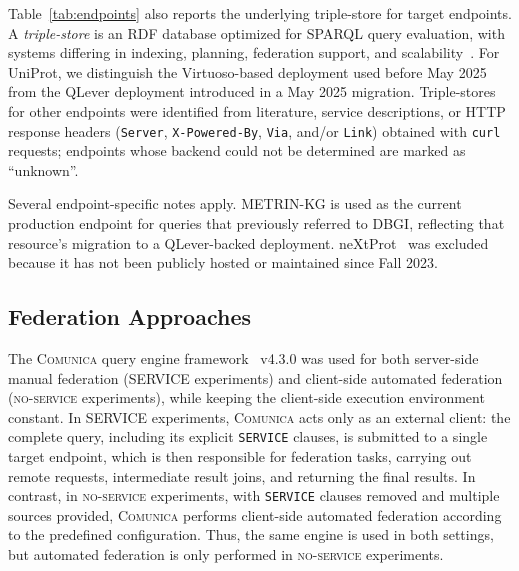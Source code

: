 \documentclass[runningheads]{llncs}
\begin{document}
Table~\ref{tab:endpoints} also reports the underlying triple-store for target endpoints. 
A \textit{triple-store} is an RDF database optimized for SPARQL query evaluation, with systems differing in indexing, planning, federation support, and scalability~\cite{Erling2009VirtuosoRDF,bast2017qlever}. 
For UniProt, we distinguish the Virtuoso-based deployment used before May 2025 from the QLever deployment introduced in a May 2025 migration. 
Triple-stores for other endpoints were identified from literature, service descriptions, or HTTP response headers (\texttt{Server}, \texttt{X-Powered-By}, \texttt{Via}, and/or \texttt{Link}) obtained with \texttt{curl} requests; endpoints whose backend could not be determined are marked as ``unknown''.

Several endpoint-specific notes apply. 
METRIN-KG is used as the current production endpoint for queries that previously referred to DBGI, reflecting that resource's migration to a QLever-backed deployment. 
neXtProt~\cite{ZahnZabal2020neXtProt} was excluded because it has not been publicly hosted or maintained since Fall 2023. 


\subsection{Federation Approaches}\label{sec4.3}
The \textsc{Comunica} query engine framework~\cite{taelman2018comunica} v4.3.0 was used for both server-side manual federation (\textsc{SERVICE} experiments) and client-side automated federation (\textsc{no-service} experiments), while keeping the client-side execution environment constant. 
In \textsc{SERVICE} experiments, \textsc{Comunica} acts only as an external client: the complete query, including its explicit \texttt{SERVICE} clauses, is submitted to a single target endpoint, which is then responsible for federation tasks, carrying out remote requests, intermediate result joins, and returning the final results.
In contrast, in \textsc{no-service} experiments, with \texttt{SERVICE} clauses removed and multiple sources provided, \textsc{Comunica} performs client-side automated federation according to the predefined configuration.
Thus, the same engine is used in both settings, but automated federation is only performed in \textsc{no-service} experiments.


\end{document}
